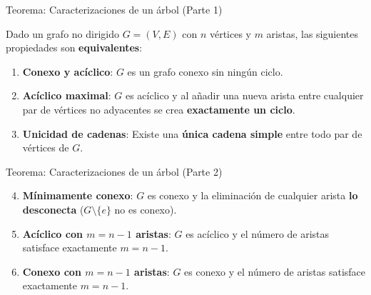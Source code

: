 \documentclass[
  ignorenonframetext,
]{beamer}
\providecommand{\tightlist}{%
  \setlength{\itemsep}{0pt}\setlength{\parskip}{0pt}}
\begin{document}
\begin{frame}{Teorema: Caracterizaciones de un árbol (Parte 1)}
\label{teorema-caracterizaciones-de-un-uxe1rbol-parte-1}
\begin{tcolorbox}[enhanced jigsaw, left=2mm, opacityback=0, titlerule=0mm, breakable, toptitle=1mm, rightrule=.15mm, bottomtitle=1mm, coltitle=black, title=\textcolor{quarto-callout-important-color}{\faExclamation}\hspace{0.5em}{Caracterizaciones equivalentes (1 a 3)}, colframe=quarto-callout-important-color-frame, colbacktitle=quarto-callout-important-color!10!white, arc=.35mm, toprule=.15mm, leftrule=.75mm, bottomrule=.15mm, opacitybacktitle=0.6, colback=white]

Dado un grafo no dirigido \(G = (V, E)\) con \(n\) vértices y \(m\)
aristas, las siguientes propiedades son \textbf{equivalentes}:

\begin{enumerate}
\tightlist
\item
  \textbf{Conexo y acíclico}: \(G\) es un grafo conexo sin ningún ciclo.
\item
  \textbf{Acíclico maximal}: \(G\) es acíclico y al añadir una nueva
  arista entre cualquier par de vértices no adyacentes se crea
  \textbf{exactamente un ciclo}.
\item
  \textbf{Unicidad de cadenas}: Existe una \textbf{única cadena simple}
  entre todo par de vértices de \(G\).
\end{enumerate}

\end{tcolorbox}
\end{frame}

\begin{frame}{Teorema: Caracterizaciones de un árbol (Parte 2)}
\label{teorema-caracterizaciones-de-un-uxe1rbol-parte-2}
\begin{tcolorbox}[enhanced jigsaw, left=2mm, opacityback=0, titlerule=0mm, breakable, toptitle=1mm, rightrule=.15mm, bottomtitle=1mm, coltitle=black, title=\textcolor{quarto-callout-important-color}{\faExclamation}\hspace{0.5em}{Caracterizaciones equivalentes (4 a 6)}, colframe=quarto-callout-important-color-frame, colbacktitle=quarto-callout-important-color!10!white, arc=.35mm, toprule=.15mm, leftrule=.75mm, bottomrule=.15mm, opacitybacktitle=0.6, colback=white]

\begin{enumerate}
\setcounter{enumi}{3}
\tightlist
\item
  \textbf{Mínimamente conexo}: \(G\) es conexo y la eliminación de
  cualquier arista \textbf{lo desconecta} (\(G \setminus \{e\}\) no es
  conexo).
\item
  \textbf{Acíclico con \(m = n - 1\) aristas}: \(G\) es acíclico y el
  número de aristas satisface exactamente \(m = n - 1\).
\item
  \textbf{Conexo con \(m = n - 1\) aristas}: \(G\) es conexo y el número
  de aristas satisface exactamente \(m = n - 1\).
\end{enumerate}

\end{tcolorbox}
\end{frame}
\end{document}
